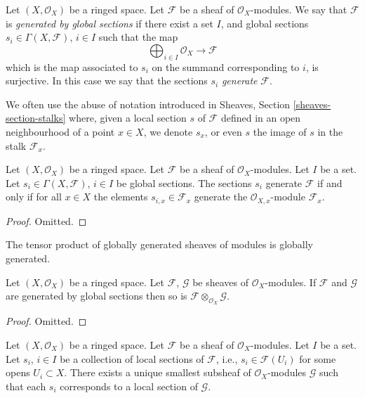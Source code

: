 \begin{definition}
\label{definition-globally-generated}
Let $(X, \mathcal{O}_X)$ be a ringed space.
Let $\mathcal{F}$ be a sheaf of $\mathcal{O}_X$-modules.
We say that $\mathcal{F}$ is {\it generated by global
sections} if there exist a set $I$, and
global sections $s_i \in \Gamma(X, \mathcal{F})$, $i \in I$
such that the map
$$
\bigoplus\nolimits_{i \in I}
\mathcal{O}_X \longrightarrow \mathcal{F}
$$
which is the map associated to $s_i$ on the summand corresponding to $i$,
is surjective. In this case we say that the sections $s_i$
{\it generate} $\mathcal{F}$.
\end{definition}

\noindent
We often use the abuse of notation introduced in
Sheaves, Section \ref{sheaves-section-stalks} where, given a local
section $s$ of $\mathcal{F}$ defined in an open neighbourhood
of a point $x \in X$, we denote $s_x$, or even $s$ the image of $s$
in the stalk $\mathcal{F}_x$.

\begin{lemma}
\label{lemma-globally-generated}
Let $(X, \mathcal{O}_X)$ be a ringed space.
Let $\mathcal{F}$ be a sheaf of $\mathcal{O}_X$-modules.
Let $I$ be a set. Let
$s_i \in \Gamma(X, \mathcal{F})$, $i \in I$
be global sections. The sections $s_i$ generate
$\mathcal{F}$ if and only if for all $x\in X$ the
elements $s_{i, x} \in \mathcal{F}_x$ generate
the $\mathcal{O}_{X, x}$-module $\mathcal{F}_x$.
\end{lemma}

\begin{proof}
Omitted.
\end{proof}

\begin{lemma}
\label{lemma-tensor-product-globally-generated}
\begin{slogan}
The tensor product of globally generated sheaves of modules is
globally generated.
\end{slogan}
Let $(X, \mathcal{O}_X)$ be a ringed space.
Let $\mathcal{F}$, $\mathcal{G}$ be sheaves of $\mathcal{O}_X$-modules.
If $\mathcal{F}$ and $\mathcal{G}$ are generated by global sections
then so is $\mathcal{F} \otimes_{\mathcal{O}_X} \mathcal{G}$.
\end{lemma}

\begin{proof}
Omitted.
\end{proof}

\begin{lemma}
\label{lemma-generated-by-local-sections}
Let $(X, \mathcal{O}_X)$ be a ringed space.
Let $\mathcal{F}$ be a sheaf of $\mathcal{O}_X$-modules.
Let $I$ be a set. Let $s_i$, $i \in I$ be a collection
of local sections of $\mathcal{F}$, i.e., $s_i \in \mathcal{F}(U_i)$
for some opens $U_i \subset X$. There exists a unique smallest
subsheaf of $\mathcal{O}_X$-modules $\mathcal{G}$ such
that each $s_i$ corresponds to a local section of
$\mathcal{G}$.
\end{lemma}


